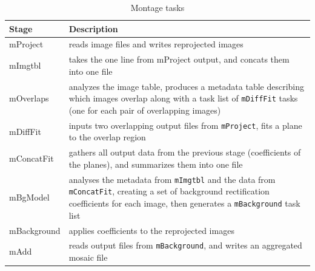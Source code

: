 \documentclass{sig-alternate}
\begin{document}
\begin{table}[h]
    \caption{Montage tasks}
   \begin{small}
    \begin{tabular}{ | p{1.8cm} | p{5.7cm} |}
    \hline
    Stage & Description  \\ \hline \hline
    mProject &  reads image files and writes reprojected images\\ \hline
    mImgtbl &  takes the one line from mProject output, and concats them into one file\\ \hline
    mOverlaps &  analyzes the image table, produces a metadata table describing which images overlap along with a task list of {\tt mDiffFit} tasks (one for each pair of overlapping images) \\ \hline
    mDiffFit &  inputs two overlapping output files from {\tt mProject}, fits a plane to the overlap region \\ \hline
    mConcatFit &  gathers all output data from the previous stage (coefficients of the planes), and summarizes them into one file \\ \hline
    mBgModel &  analyses the metadata from {\tt mImgtbl} and the data from {\tt mConcatFit}, creating a set of background rectification coefficients for each image, then generates a {\tt mBackground} task list \\ \hline
    mBackground &  applies coefficients to the reprojected images\\ \hline
    mAdd &  reads output files from {\tt mBackground}, and writes an aggregated mosaic file \\ \hline
    \end{tabular}
    \end{small}
      \label{tb:Montage}
\end{table}
\end{document}

